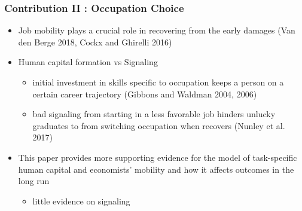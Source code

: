 \documentclass[11pt]{beamer}
\begin{document}
\begin{frame}
	\frametitle{Contribution II : Occupation Choice} 
	\begin{itemize}
		\item Job mobility plays a crucial role in recovering from the early damages  (Van den Berge 2018, Cockx and Ghirelli 2016) 
		\vspace{1.6 mm}
		\item Human capital formation vs Signaling 
			\begin{itemize}
				\item initial investment in skills specific to occupation keeps a person on a certain career trajectory (Gibbons and Waldman 2004, 2006)
				\item bad signaling from starting in a less favorable job hinders unlucky graduates to from switching occupation when recovers (Nunley et al. 2017)
			\end{itemize}
		\vspace{1.6 mm}
		\item This paper provides more supporting evidence for the model of task-specific human capital and economists’ mobility and how it affects outcomes in the long run
		\begin{itemize}
			\item little evidence on signaling
		\end{itemize}		
	\end{itemize}
\end{frame}
\end{document}
